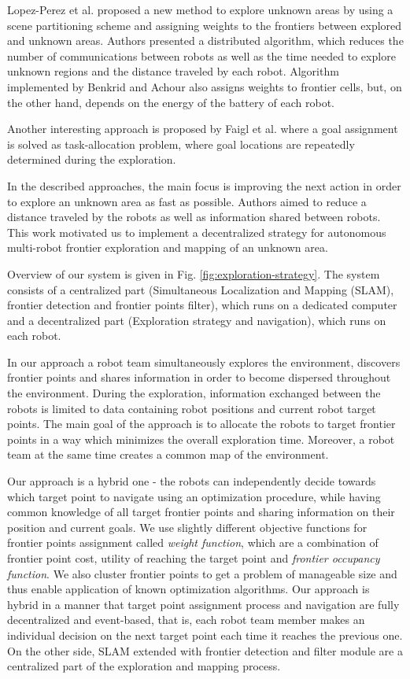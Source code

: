 Lopez-Perez et al. \cite{LopezPerez2018} proposed a new method to explore unknown areas by using a scene partitioning scheme and assigning weights to the frontiers between explored and unknown areas. Authors presented a distributed algorithm, which reduces the number of communications between robots as well as the time needed to explore unknown regions and the distance traveled by each robot. Algorithm implemented by Benkrid and Achour \cite{Benkrid2017} also assigns weights to frontier cells, but, on the other hand, depends on the energy of the battery of each robot.

Another interesting approach is proposed by Faigl et al. \cite{Faigl2015} where a goal assignment is solved as task-allocation problem, where goal locations are repeatedly determined during the exploration. 

In the described approaches, the main focus is improving the next action in order to explore an unknown area as fast as possible. Authors aimed to reduce a distance traveled by the robots as well as information shared between robots. This work motivated us to implement a decentralized strategy for autonomous multi-robot frontier exploration and mapping of an unknown area. 

Overview of our system is given in Fig. \ref{fig:exploration-strategy}. The system consists of a centralized part (Simultaneous Localization and Mapping (SLAM), frontier detection and frontier points filter), which runs on a dedicated computer and a decentralized part (Exploration strategy and navigation), which runs on each robot. 

In our approach a robot team simultaneously explores the environment, discovers frontier points and shares information in order to become dispersed throughout the environment. During the exploration, information exchanged between the robots is limited to data containing robot positions and current robot target points. The main goal of the approach is to allocate the robots to target frontier points in a way which minimizes the overall exploration time. Moreover, a robot team at the same time creates a common map of the environment. 

Our approach is a hybrid one - the robots can independently decide towards which target point to navigate using an optimization procedure, while having common knowledge of all target frontier points and sharing information on their position and current goals. We use slightly different objective functions for frontier points assignment called \textit{weight function}, which are a combination of frontier point cost, utility of reaching the target point and \textit{frontier occupancy function}. We also cluster frontier points to get a problem of manageable size and thus enable application of known optimization algorithms. 
Our approach is hybrid in a manner that target point assignment process and navigation are fully decentralized and event-based, that is, each robot team member makes an individual decision on the next target point each time it reaches the previous one. On the other side, SLAM extended with frontier detection and filter module are a centralized part of the exploration and mapping process.

